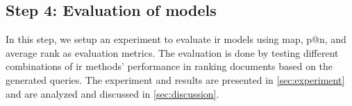 \subsection*{Step 4: Evaluation of models}
In this step, we setup an experiment to evaluate \gls{ir} models using \gls{map}, p@n, and average rank as evaluation metrics.
The evaluation is done by testing different combinations of \gls{ir} methods' performance in ranking documents based on the generated queries. 
The experiment and results are presented in \autoref{sec:experiment} and are analyzed and discussed in  \autoref{sec:discussion}.



